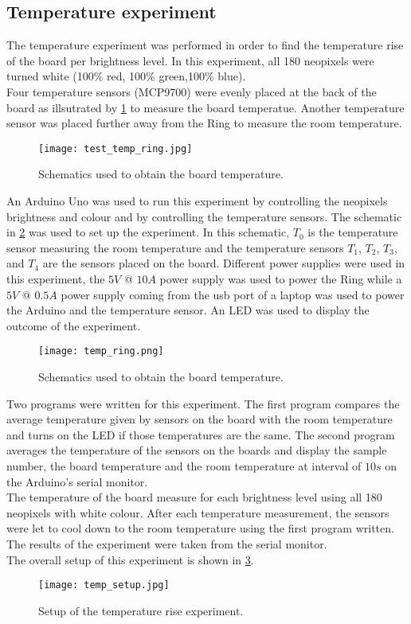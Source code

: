 \subsection{Temperature experiment}
The temperature experiment was performed in order to find the temperature rise of the board per brightness level. In this experiment, all 180 neopixels were turned white (100\% red, 100\% green,100\% blue). \\
Four temperature sensors (MCP9700) were evenly placed at the back of the board as illsutrated by \cref{fig:test_temp_ring} to measure the board temperatue. Another temperature sensor was placed further away from the Ring to measure the room temperature. 
\begin{figure}[ht]
	\centering
	\texttt{[image: test\_temp\_ring.jpg]}
	\caption{Schematics used to obtain the board temperature.}
	\label{fig:test_temp_ring}
\end{figure}
An Arduino Uno was used to run this experiment by controlling the neopixels brightness and colour and by controlling the temperature sensors. The schematic in \cref{fig:temp_ring} was used to set up the experiment. In this schematic, $T_0$ is the temperature sensor measuring the room temperature and the temperature sensors $T_1$, $T_2$, $T_3$, and $T_4$ are the sensors placed on the board. Different power supplies were used in this experiment, the $5V$ @ $10A$ power supply was used to power the Ring while a $5V$ @ $0.5A$ power supply coming from the usb port of a laptop was used to power the Arduino and the temperature sensor. An LED was used to display the outcome of the experiment.
\begin{figure}[h!]
	\centering
	\texttt{[image: temp\_ring.png]}
	\caption{Schematics used to obtain the board temperature.}
	\label{fig:temp_ring}
\end{figure}
Two programs were written for this experiment. The first program compares the average temperature given by sensors on the board with the room temperature and turns on the LED if those temperatures are the same. The second program averages the temperature of the sensors on the boards and display the sample number, the board temperature and the room temperature at interval of $10s$ on the Arduino's serial monitor.\\
The temperature of the board measure for each brightness level using all 180 neopixels with white colour. After each temperature measurement, the sensors were let to cool down to the room temperature using the first program written. The results of the experiment were taken from the serial monitor.\\
The overall setup of this experiment is shown in \ref{fig:temp_setup}.
\begin{figure}[h!]
	\centering
	\texttt{[image: temp\_setup.jpg]}
	\caption{Setup of the temperature rise experiment.}
	\label{fig:temp_setup}
\end{figure}

